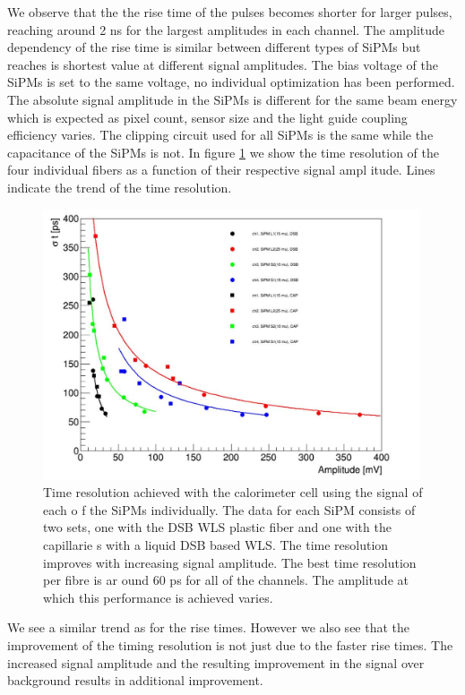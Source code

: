%
We observe that the the rise time of the pulses becomes shorter for larger pulses, reaching around 2 ns for the largest amplitudes
in each channel. 
The amplitude dependency of the rise time is similar between different types of SiPMs but reaches is shortest value at
different signal amplitudes. 
The bias voltage of the SiPMs is set to the same voltage, no individual optimization has been
performed. The absolute signal amplitude in the SiPMs is different for the same beam energy which is expected as pixel count,
sensor size and the light guide coupling efficiency varies. The clipping circuit used for all SiPMs is the same while the capacitance 
of the  SiPMs is not.    
In figure \ref{TimeResolution} we show the time resolution of the four individual fibers as a function of their respective signal ampl
itude. Lines indicate the trend of the time resolution.
%
\begin{figure}[htbc]
\includegraphics[width=0.99\textwidth]{SH_timing_SiPM.pdf}
\caption{\label{TimeResolution} Time resolution achieved with the calorimeter cell using the signal of each o
f the  SiPMs individually. The data for each SiPM consists of two sets, one with the DSB WLS plastic fiber and one with the capillarie
s with a liquid DSB based WLS. The time resolution improves with increasing signal amplitude. The best time resolution per fibre is ar
ound 60 ps for all of the channels. The amplitude at which this performance is achieved varies.}
\end{figure}
%
We see a similar trend as for the rise times. However we also see
that the improvement of the timing resolution is not just due to the faster rise times.  
The increased signal amplitude and the resulting improvement in the signal over background results in additional improvement.

